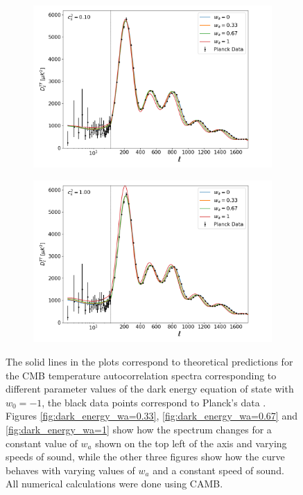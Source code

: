 \documentclass[openany,a4paper,12pt,oneside]{book}
\begin{document}
\begin{spacing}{1.5}
\begin{figure}
{\begin{subfigure}[t]{.43\paperwidth}
		\includegraphics[width=\linewidth]{Imagens/full_doublscale_Cs2fixo0.10.png}
		\caption{}
		\label{fig:dark_energy_cs2=0.1}
	\end{subfigure}
	\hfill
	\begin{subfigure}[t]{.43\paperwidth}
		\centering
		\includegraphics[width=\linewidth]{Imagens/full_doublscale_Cs2fixo1.00.png}
		\caption{}
		\label{fig:dark_energy_cs2=1}
	\end{subfigure}
}
\caption{The solid lines in the plots correspond to theoretical predictions for the CMB temperature autocorrelation spectra corresponding to different parameter values of the dark energy equation of state with $w_0=-1$, the black data points correspond to Planck's data \cite{Planck_results}. Figures \ref{fig:dark_energy_wa=0.33}, \ref{fig:dark_energy_wa=0.67} and \ref{fig:dark_energy_wa=1} show how the spectrum changes for a constant value of $w_a$ shown on the top left of the axis and varying speeds of sound, while the other three figures show how the curve behaves with varying values of $w_a$ and a constant speed of sound. All numerical calculations were done using CAMB.}
\label{fig:Dark_energy_tests}
\end{figure}


\end{spacing}
\end{document}
